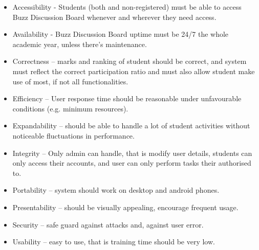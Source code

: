 \documentclass[a4paper,12pt]{report}
\begin{document}
\begin{itemize}
  \item Accessibility - Students (both   and non-registered) must be able to access Buzz Discussion Board 		whenever and wherever they need access.
  \item Availability - Buzz Discussion Board uptime must be 24/7 the whole academic year, unless there’s 		maintenance.
  \item Correctness – marks and ranking of student should be correct, and system must reflect the correct 		participation ratio and must also allow student make use of most, if not all functionalities.
  \item Efficiency – User response time should be reasonable under unfavourable conditions (e.g. minimum 		resources).
  \item Expandability – should be able to handle a lot of student activities without noticeable 				fluctuations in performance.
  \item Integrity – Only admin can handle, that is modify user details, students can only access their 			accounts, and user can only perform tasks their authorised to.
  \item Portability – system should work on desktop and android phones.
  \item Presentability – should be visually appealing, encourage frequent usage.
  \item Security – safe guard against attacks and, against user error.
  \item Usability – easy to use, that is training time should be very low.
\end{itemize}
\end{document}
